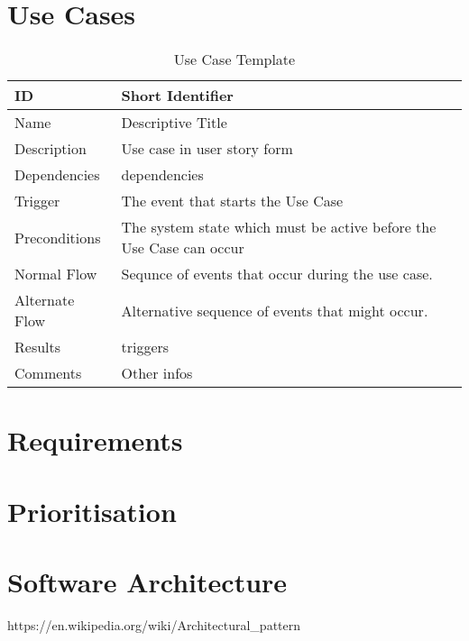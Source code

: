 \section{Use Cases}

\begin{table}[H]
    \begin{tabular}{ | l | p{7cm} |}
    \hline
    ID &  Short Identifier \\ \hline
    Name & Descriptive Title \\ \hline
    Description &  Use case in user story form\\ \hline
    Dependencies & dependencies \\ \hline
    Trigger & The event that starts the Use Case \\ \hline
    Preconditions & The system state which must be active before the Use Case can occur \\ \hline
    Normal Flow & Sequnce of events that occur during the use case. \\ \hline
    Alternate Flow & Alternative sequence of events that might occur. \\ \hline
    Results & triggers \\ \hline
    Comments & Other infos \\ \hline


    \end{tabular}

    \caption{Use Case Template}

    \label{fig:android_apps}
\end{table}



\section{Requirements}
\section{Prioritisation}
\section{Software Architecture}


https://en.wikipedia.org/wiki/Architectural\_pattern
